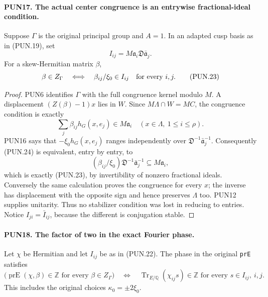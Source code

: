 \paragraph{PUN17. The actual center congruence is an entrywise fractional-ideal condition.}
\label{claim:PUN17}
Suppose \(\Gamma\) is the original principal group and \(A=1\).
In an adapted cusp basis as in (PUN.19), set
\[
            I_{ij}=M\mathfrak a_i\mathfrak D\bar{\mathfrak a}_j.
 \tag{PUN.22}
\]
For a skew-Hermitian matrix \(\beta\),
\[
 \beta\in Z_\Gamma
       \quad\Longleftrightarrow\quad
           \beta_{ij}/\xi_0\in I_{ij}\quad\hbox{for every }i,j.
 \tag{PUN.23}
\]

\begin{proof}
PUN6 identifies \(\Gamma\) with the full congruence kernel
modulo \(M\).  A displacement \((Z(\beta)-1)x\) lies in
\(W\).  Since \(M\Lambda\cap W=MC\), the congruence
condition is exactly
\[
  \sum_j\beta_{ij}h_G(x,e_j)\in M\mathfrak a_i
                      \quad(x\in\Lambda,\ 1\le i\le\rho).
 \tag{PUN.24}
\]
PUN16 says that \(-\xi_0h_G(x,e_j)\) ranges independently
over \(\mathfrak D^{-1}\bar{\mathfrak a}_j^{-1}\).
Consequently (PUN.24) is equivalent, entry by entry, to
\[
 (\beta_{ij}/\xi_0)
        \mathfrak D^{-1}\bar{\mathfrak a}_j^{-1}
                                      \subseteq M\mathfrak a_i,
\]
which is exactly (PUN.23), by invertibility of nonzero fractional
ideals.  Conversely the same calculation proves the congruence
for every \(x\); the inverse has displacement with the opposite
sign and hence preserves \(\Lambda\) too.  PUN12 supplies
unitarity.  Thus no stabilizer condition was lost in reducing
to entries.  Notice \(I_{ji}=\bar I_{ij}\), because the
different is conjugation stable.
\end{proof}

\paragraph{PUN18. The factor of two in the exact Fourier phase.}
\label{claim:PUN18}
Let \(\chi\) be Hermitian and let \(I_{ij}\) be as in
(PUN.22).  The phase in the original \texttt{prE} satisfies
\[
 \bigl(\operatorname{prE}(\chi,\beta)\in\mathbb Z
                 \text{ for every }\beta\in Z_\Gamma\bigr)
 \quad\Longleftrightarrow\quad
 \operatorname{Tr}_{E/\mathbb Q}(\chi_{ij}s)\in\mathbb Z
                 \text{ for every }s\in I_{ij},\ i,j.
 \tag{PUN.25}
\]
This includes the original choices \(\kappa_0=\pm2\xi_0\).


